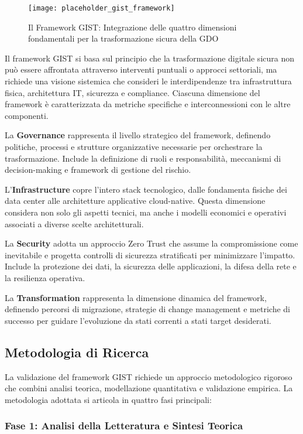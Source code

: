 \begin{figure}[htbp]
\centering
\texttt{[image: placeholder\_gist\_framework]}
\caption{Il Framework GIST: Integrazione delle quattro dimensioni fondamentali per la trasformazione sicura della GDO}
\label{fig:gist_framework}
\end{figure}

Il framework GIST si basa sul principio che la trasformazione digitale sicura non può essere affrontata attraverso interventi puntuali o approcci settoriali, ma richiede una visione sistemica che consideri le interdipendenze tra infrastruttura fisica, architettura IT, sicurezza e compliance. Ciascuna dimensione del framework è caratterizzata da metriche specifiche e interconnessioni con le altre componenti.

La \textbf{Governance} rappresenta il livello strategico del framework, definendo politiche, processi e strutture organizzative necessarie per orchestrare la trasformazione. Include la definizione di ruoli e responsabilità, meccanismi di decision-making e framework di gestione del rischio.

L'\textbf{Infrastructure} copre l'intero stack tecnologico, dalle fondamenta fisiche dei data center alle architetture applicative cloud-native. Questa dimensione considera non solo gli aspetti tecnici, ma anche i modelli economici e operativi associati a diverse scelte architetturali.

La \textbf{Security} adotta un approccio Zero Trust che assume la compromissione come inevitabile e progetta controlli di sicurezza stratificati per minimizzare l'impatto. Include la protezione dei dati, la sicurezza delle applicazioni, la difesa della rete e la resilienza operativa.

La \textbf{Transformation} rappresenta la dimensione dinamica del framework, definendo percorsi di migrazione, strategie di change management e metriche di successo per guidare l'evoluzione da stati correnti a stati target desiderati.

\subsection{Metodologia di Ricerca}

La validazione del framework GIST richiede un approccio metodologico rigoroso che combini analisi teorica, modellazione quantitativa e validazione empirica. La metodologia adottata si articola in quattro fasi principali:

\subsubsection{Fase 1: Analisi della Letteratura e Sintesi Teorica}

